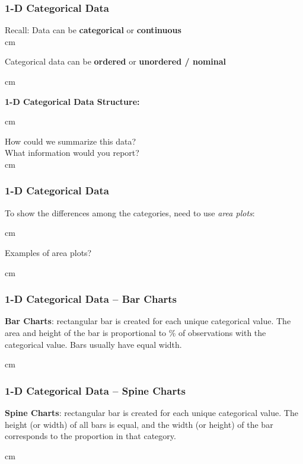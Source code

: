 \documentclass{beamer} %
\begin{document}
\begin{frame}\frametitle{1-D Categorical Data}
	\small
	Recall:  Data can be \textbf{categorical} or \textbf{continuous}\\
	
	 cm
	
	Categorical data can be \textbf{ordered} or \textbf{unordered / nominal}
	
	 cm
	
	\textbf{1-D Categorical Data Structure:}
	
	 cm
	
	How could we summarize this data?\\
	What information would you report?\\
	
	 cm
	
\end{frame}



\begin{frame}\frametitle{1-D Categorical Data}
	\small
	
	To show the differences among the categories, need to use \emph{area plots}:
	
	 cm
	
	Examples of area plots?
	
	 cm
	
\end{frame}


\begin{frame}\frametitle{1-D Categorical Data -- Bar Charts}
	\small
	
	\textbf{Bar Charts}:  rectangular bar is created for each unique categorical value.  The area and height of the bar is proportional to \% of observations with the categorical value.  Bars usually have equal width.
	
	
	 cm
	
\end{frame}



\begin{frame}\frametitle{1-D Categorical Data -- Spine Charts}
	\small
	
	\textbf{Spine Charts}:  rectangular bar is created for each unique categorical value.  The height (or width) of all bars is equal, and the width (or height) of the bar corresponds to the proportion in that category.
	
	 cm
	
\end{frame}
\end{document}
